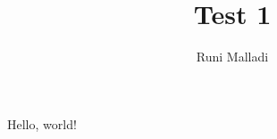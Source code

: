 \documentclass[12pt]{article}
\title{Test 1}
\author{Runi Malladi}
\begin{document}
\maketitle

Hello, world!
\end{document}
